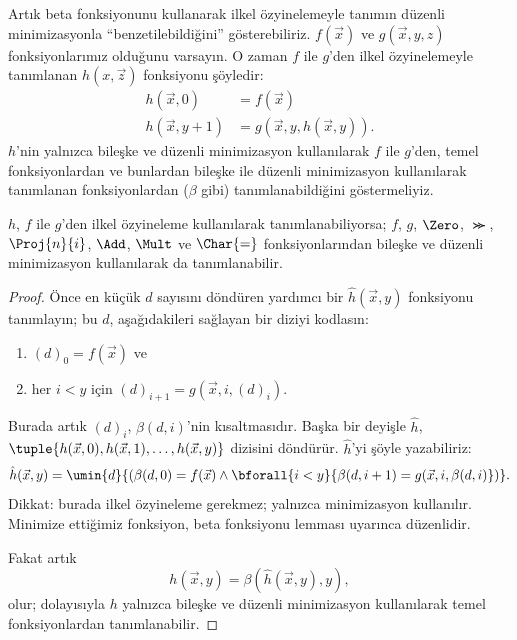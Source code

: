 


Artık beta fonksiyonunu kullanarak ilkel özyinelemeyle tanımın düzenli
minimizasyonla ``benzetilebildiğini'' gösterebiliriz. $f(\vec x)$ ve
$g(\vec x,y,z)$ fonksiyonlarımız olduğunu varsayın. O zaman $f$ ile $g$'den
ilkel özyinelemeyle tanımlanan $h(x,\vec z)$ fonksiyonu şöyledir:
\begin{align*}
h(\vec x, 0) & =  f(\vec x) \\
h(\vec x, y+1) & =  g(\vec x, y, h(\vec x, y)).
\end{align*}
$h$'nin yalnızca bileşke ve düzenli minimizasyon kullanılarak $f$ ile
$g$'den, temel fonksiyonlardan ve bunlardan bileşke ile düzenli minimizasyon
kullanılarak tanımlanan fonksiyonlardan ($\beta$ gibi) tanımlanabildiğini
göstermeliyiz.

\begin{lem}
$h$, $f$ ile $g$'den ilkel özyineleme kullanılarak tanımlanabiliyorsa;
$f$, $g$, $\Zero$, $\Succ$, $\Proj{n}{i}$, $\Add$, $\Mult$ ve $\Char{=}$
fonksiyonlarından bileşke ve düzenli minimizasyon kullanılarak da
tanımlanabilir.
\end{lem}

\begin{proof}
Önce en küçük $d$ sayısını döndüren yardımcı bir $\hat h(\vec x,y)$
fonksiyonu tanımlayın; bu $d$, aşağıdakileri sağlayan bir diziyi kodlasın:
\begin{enumerate}
\item $(d)_0 = f(\vec x)$ ve
\item her $i<y$ için $(d)_{i+1}=g(\vec x,i,(d)_i)$.
\end{enumerate}
Burada artık $(d)_i$, $\beta(d,i)$'nin kısaltmasıdır. Başka bir deyişle
$\hat h$, $\tuple{h(\vec x,0),h(\vec x,1),\dots,h(\vec x,y)}$ dizisini
döndürür. $\hat h$'yi şöyle yazabiliriz:
\[
\hat h(\vec x, y) = \umin{d}{(\beta(d,0) = f(\vec x) \land \bforall{i <
  y}{\beta(d,i+1) = g(\vec x, i,\beta(d,i)})}.
\]
Dikkat: burada ilkel özyineleme gerekmez; yalnızca minimizasyon kullanılır.
Minimize ettiğimiz fonksiyon,  beta fonksiyonu lemması
uyarınca düzenlidir.

Fakat artık
\[
h(\vec x, y) = \beta(\hat h(\vec x, y), y),
\]
olur; dolayısıyla $h$ yalnızca bileşke ve düzenli minimizasyon kullanılarak
temel fonksiyonlardan tanımlanabilir.
\end{proof}

